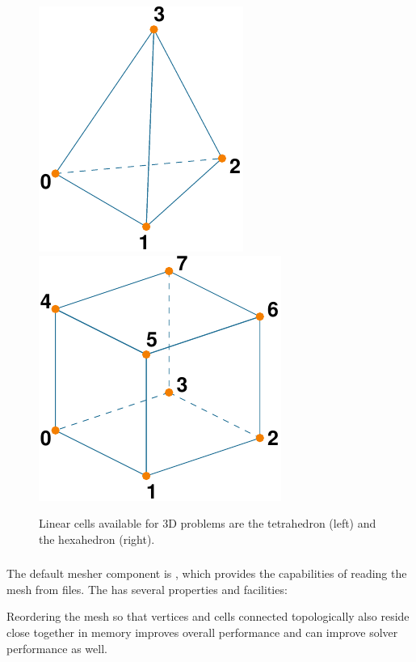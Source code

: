 \begin{figure}[htbp]
  \includegraphics{runpylith/figs/tet4}\hspace*{0.5in}%
  \includegraphics{runpylith/figs/hex8}
  \caption{Linear cells available for 3D problems are the tetrahedron (left)
    and the hexahedron (right).}
  \label{fig:3D:cells}
\end{figure}

\subsubsection{}

The default mesher component is , which provides
the capabilities of reading the mesh from files. The  has
several properties and facilities:
\begin{inventory}
\end{inventory}
Reordering the mesh so that vertices and cells connected topologically
also reside close together in memory improves overall performance
and can improve solver performance as well.

